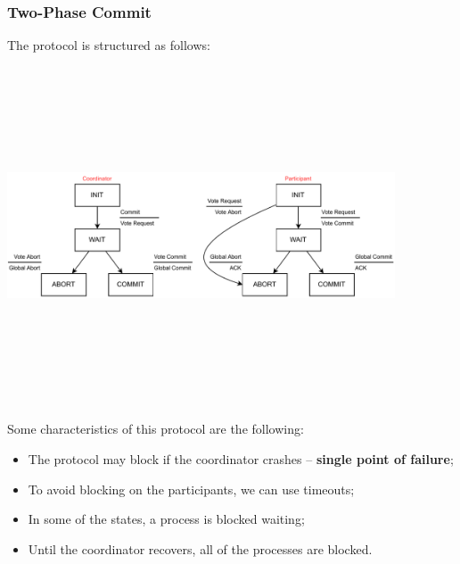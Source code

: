 \documentclass{article}
\begin{document}
\subsubsection{Two-Phase Commit}
The protocol is structured as follows:
\begin{center}
	\includegraphics[width=11.5cm, height=10cm, keepaspectratio]{assets/two-phase.pdf}
\end{center}
Some characteristics of this protocol are the following:
\begin{itemize}
	\item The protocol may block if the coordinator crashes -- \textbf{single point of failure};
	\item To avoid blocking on the participants, we can use timeouts;
	\item In some of the states, a process is blocked waiting;
	\item Until the coordinator recovers, all of the processes are blocked.
\end{itemize}
\end{document}
